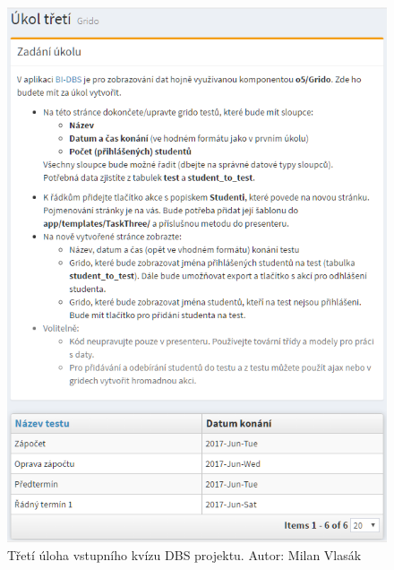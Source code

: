 \begin{figure}[]
\includegraphics[width=\textwidth]{../png/quiz-3.png}
\caption{Třetí úloha vstupního kvízu DBS projektu. Autor: Milan Vlasák} \label{picture:quiz-3}
\end{figure}
